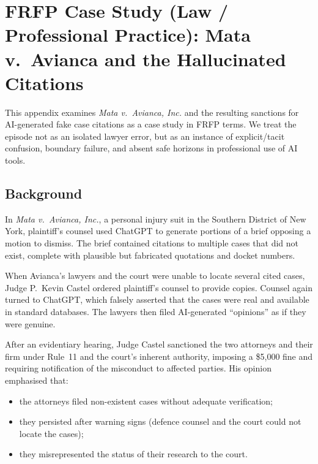 
\section{FRFP Case Study (Law / Professional Practice): Mata v.\ Avianca and the Hallucinated Citations}
\label{app:frfp-mata-avianca}

This appendix examines \emph{Mata v.\ Avianca, Inc.} and the resulting
sanctions for AI-generated fake case citations as a case study in FRFP terms.
We treat the episode not as an isolated lawyer error, but as an instance of
explicit/tacit confusion, boundary failure, and absent safe horizons in
professional use of AI tools.

\subsection{Background}

In \emph{Mata v.\ Avianca, Inc.}, a personal injury suit in the Southern
District of New York, plaintiff’s counsel used ChatGPT to generate portions
of a brief opposing a motion to dismiss.
The brief contained citations to multiple cases that did not exist, complete
with plausible but fabricated quotations and docket numbers.

When Avianca’s lawyers and the court were unable to locate several cited
cases, Judge P.\ Kevin Castel ordered plaintiff’s counsel to provide copies.
Counsel again turned to ChatGPT, which falsely asserted that the cases were
real and available in standard databases.
The lawyers then filed AI-generated ``opinions'' as if they were genuine.

After an evidentiary hearing, Judge Castel sanctioned the two attorneys and
their firm under Rule~11 and the court’s inherent authority, imposing a
\$5{,}000 fine and requiring notification of the misconduct to affected
parties.
His opinion emphasised that:

\begin{itemize}
  \item the attorneys filed non-existent cases without adequate verification;
  \item they persisted after warning signs (defence counsel and the court
        could not locate the cases);
  \item they misrepresented the status of their research to the court.
\end{itemize}

